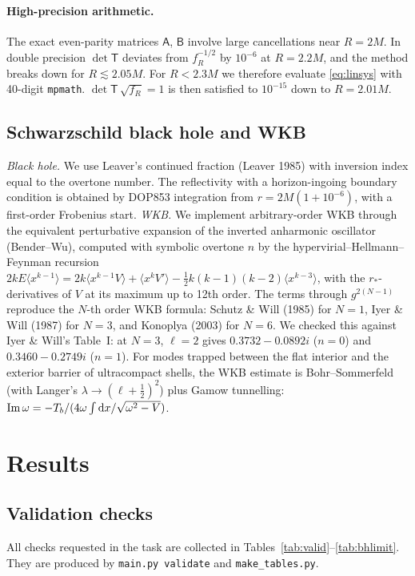\documentclass[11pt,a4paper]{article}
\numberwithin{equation}{section}
\newcommand{\sq}{\sqrt{f_R}}
\newcommand{\dd}{\mathrm{d}}
\begin{document}
\paragraph{High-precision arithmetic.} The exact even-parity matrices $\mathsf A$, $\mathsf B$ involve large
cancellations near $R=2M$. In double precision $\det\mathsf T$ deviates from $f_R^{-1/2}$ by $10^{-6}$ at
$R=2.2M$, and the method breaks down for $R\lesssim2.05M$. For $R<2.3M$ we therefore evaluate
\eqref{eq:linsys} with 40-digit \texttt{mpmath}. $\det\mathsf T\,\sq=1$ is then satisfied to $10^{-15}$ down to
$R=2.01M$.

\subsection{Schwarzschild black hole and WKB}
\emph{Black hole.} We use Leaver's continued fraction (Leaver 1985) with inversion index equal to the
overtone number. The reflectivity with a horizon-ingoing boundary condition is obtained by DOP853
integration from $r=2M(1+10^{-6})$, with a first-order Frobenius start.
\emph{WKB.} We implement arbitrary-order WKB through the equivalent perturbative expansion of the inverted
anharmonic oscillator (Bender--Wu), computed with symbolic overtone $n$ by the hypervirial--Hellmann--Feynman
recursion
$2kE\langle x^{k-1}\rangle=2k\langle x^{k-1}V\rangle+\langle x^kV'\rangle-\tfrac12k(k-1)(k-2)\langle x^{k-3}\rangle$,
with the $r_*$-derivatives of $V$ at its maximum up to 12th order. The terms through $g^{2(N-1)}$ reproduce
the $N$-th order WKB formula: Schutz \& Will (1985) for $N=1$, Iyer \& Will (1987) for $N=3$, and Konoplya
(2003) for $N=6$. We checked this against Iyer \& Will's Table~I: at $N=3$, $\ell=2$ gives
$0.3732-0.0892i$ ($n=0$) and $0.3460-0.2749i$ ($n=1$). For modes trapped between the flat interior and the
exterior barrier of ultracompact shells, the WKB estimate is Bohr--Sommerfeld (with Langer's
$\lambda\to(\ell+\tfrac12)^2$) plus Gamow tunnelling:
${\rm Im}\,\omega=-T_b/(4\omega\int\dd x/\sqrt{\omega^2-V})$.


\section{Results}\label{sec:results}

\subsection{Validation checks}\label{sec:res-valid}
All checks requested in the task are collected in Tables~\ref{tab:valid}--\ref{tab:bhlimit}. They are
produced by \texttt{main.py validate} and \texttt{make\_tables.py}.
\end{document}

